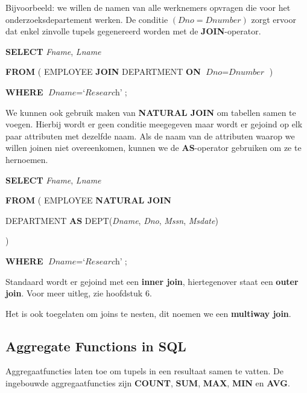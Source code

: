 Bijvoorbeeld: we willen de namen van alle werknemers opvragen die voor het onderzoeksdepartement werken. De conditie $(\textit{Dno} = \textit{Dnumber})$ zorgt ervoor dat enkel zinvolle tupels gegenereerd worden met de \textbf{JOIN}-operator.

\vspace{1mm}\hspace{10mm}
\textbf{SELECT} \textit{Fname}, \textit{Lname}

\hspace{10mm}
\textbf{FROM} ( EMPLOYEE \textbf{JOIN} DEPARTMENT \textbf{ON} $\textit{Dno} = \textit{Dnumber}$ )

\hspace{10mm}
\textbf{WHERE} $\textit{Dname} = \textit{`Research'}$;
\vspace{3mm}

\noindent We kunnen ook gebruik maken van \textbf{NATURAL JOIN} om tabellen samen te voegen. Hierbij wordt er geen conditie meegegeven maar wordt er gejoind op elk paar attributen met dezelfde naam. Als de naam van de attributen waarop we willen joinen niet overeenkomen, kunnen we de \textbf{AS}-operator gebruiken om ze te hernoemen.

\vspace{1mm}\hspace{10mm}
\textbf{SELECT} \textit{Fname}, \textit{Lname}

\hspace{10mm}
\textbf{FROM} ( EMPLOYEE \textbf{NATURAL JOIN}

\hspace{40mm}
DEPARTMENT \textbf{AS} DEPT(\textit{Dname}, \textit{Dno}, \textit{Mssn}, \textit{Msdate})

\hspace{10mm}
 )

\hspace{10mm}
\textbf{WHERE} $\textit{Dname} = \textit{`Research'}$;
\vspace{3mm}

\noindent Standaard wordt er gejoind met een \textbf{inner join}, hiertegenover staat een \textbf{outer join}. Voor meer uitleg, zie hoofdstuk 6.

Het is ook toegelaten om joins te nesten, dit noemen we een \textbf{multiway join}.


\subsection{Aggregate Functions in SQL}
Aggregaatfuncties laten toe om tupels in een resultaat samen te vatten. De ingebouwde aggregaatfuncties zijn \textbf{COUNT}, \textbf{SUM}, \textbf{MAX}, \textbf{MIN} en \textbf{AVG}.

